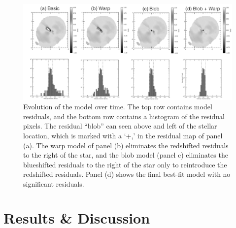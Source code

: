 \documentclass{knac}
\begin{document}
\begin{figure}
  \label{fig:model summary}
  \centering
  \includegraphics[width=\linewidth]{model_summary.png}
  \caption[No Warp Fit Plots]{Evolution of the model over time. The top row contains model residuals, and the bottom row contains a histogram of the residual pixels. The residual ``blob'' can seen above and left of the stellar location, which is marked with a `+,' in the residual map of panel (a). The warp model of panel (b) eliminates the redshifted residuals to the right of the star, and the blob model (panel c) eliminates the blueshifted residuals to the right of the star only to reintroduce the redshifted residuals. Panel (d) shows the final best-fit model with no significant residuals.}
\end{figure}


\section{Results \& Discussion}
\end{document}
